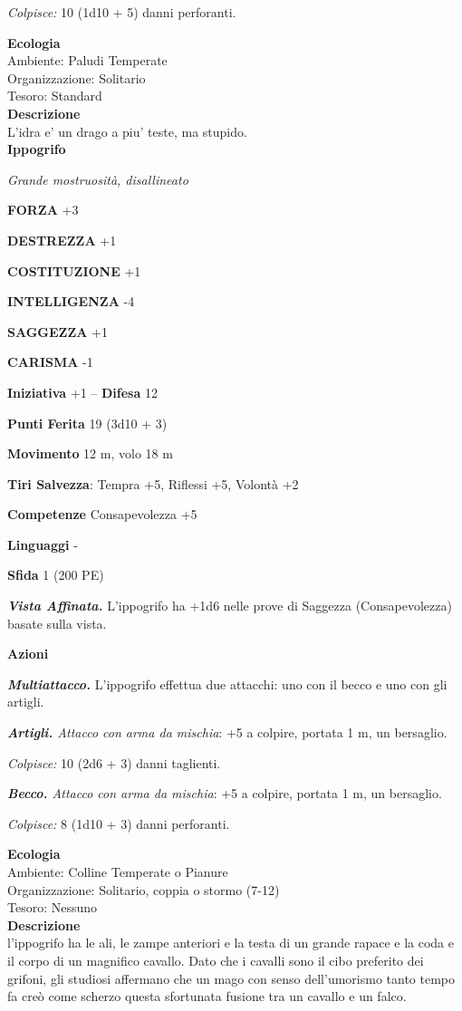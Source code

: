 \begin{multicols}{2}
\emph{Colpisce:} 10 (1d10 + 5) danni perforanti.

\textbf{Ecologia}\\
Ambiente: Paludi Temperate\\
Organizzazione: Solitario\\
Tesoro: Standard\\
\textbf{Descrizione}\\
L'idra e' un drago a piu' teste, ma stupido.\\


\medskip{}\textbf{Ippogrifo}

\emph{Grande mostruosità, disallineato}

\textbf{FORZA} +3

\textbf{DESTREZZA} +1

\textbf{COSTITUZIONE} +1

\textbf{INTELLIGENZA} -4

\textbf{SAGGEZZA} +1

\textbf{CARISMA} -1

\textbf{Iniziativa} +1 -- \textbf{Difesa} 12

\textbf{Punti Ferita} 19 (3d10 + 3)

\textbf{Movimento} 12 m, volo 18 m

\textbf{Tiri Salvezza}: Tempra +5, Riflessi +5, Volontà +2

\textbf{Competenze} Consapevolezza +5

\textbf{Linguaggi} -

\textbf{Sfida} 1 (200 PE)

\emph{\textbf{Vista Affinata.}} L'ippogrifo ha +1d6 nelle prove di Saggezza (Consapevolezza) basate sulla vista.

\textbf{Azioni}

\emph{\textbf{Multiattacco.}} L'ippogrifo effettua due attacchi: uno con il becco e uno con gli artigli.

\emph{\textbf{Artigli.} Attacco con arma da mischia}: +5 a colpire, portata 1 m, un bersaglio.

\emph{Colpisce:} 10 (2d6 + 3) danni taglienti.

\emph{\textbf{Becco.} Attacco con arma da mischia}: +5 a colpire,
portata 1 m, un bersaglio.

\emph{Colpisce:} 8 (1d10 + 3) danni perforanti.

\textbf{Ecologia}\\
Ambiente: Colline Temperate o Pianure\\
Organizzazione: Solitario, coppia o stormo (7-12)\\
Tesoro: Nessuno\\
\textbf{Descrizione}\\
l'ippogrifo ha le ali, le zampe anteriori e la testa di un grande rapace e la coda e il corpo di un magnifico cavallo. Dato che i cavalli sono il cibo preferito dei grifoni, gli studiosi affermano che un mago con senso dell'umorismo tanto tempo fa creò come scherzo questa sfortunata fusione tra un cavallo e un falco.\\


\end{multicols}
